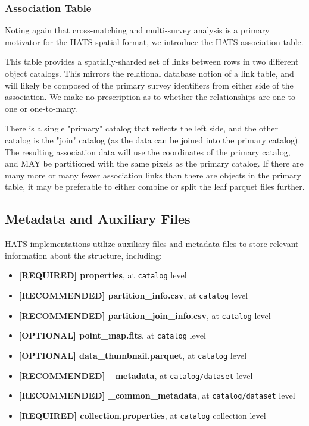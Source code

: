 \documentclass[11pt,a4paper]{ivoa}
\begin{document}
\subsubsection{Association Table} \label{sec:association}

Noting again that cross-matching and multi-survey analysis is a primary motivator for the HATS spatial format, we introduce the HATS association table. 

This table provides a spatially-sharded set of links between rows in two different object catalogs. 
This mirrors the relational database notion of a link table, and will likely be composed of the primary survey identifiers from either side of the association.
We make no prescription as to whether the relationships are one-to-one or one-to-many. \par

There is a single "primary" catalog that reflects the left side, and the other catalog is the "join" catalog (as the data can be joined into the primary catalog).
The resulting association data will use the coordinates of the primary catalog, and MAY be partitioned with the same pixels as the primary catalog.
If there are many more or many fewer association links than there are objects in the primary table, it may be preferable to either combine or split the leaf parquet files further.


\subsection{Metadata and Auxiliary Files} \label{sec:meta}
HATS implementations utilize auxiliary files and metadata files to store relevant information about the  structure, including:
\begin{itemize}
    \item \textbf{[REQUIRED] properties}, at  \texttt{catalog} level    
    \item \textbf{[RECOMMENDED] partition\_info.csv}, at  \texttt{catalog} level
    \item \textbf{[RECOMMENDED] partition\_join\_info.csv}, at  \texttt{catalog} level
    \item \textbf{[OPTIONAL] point\_map.fits}, at  \texttt{catalog} level
    \item \textbf{[OPTIONAL] data\_thumbnail.parquet}, at  \texttt{catalog} level
    \item \textbf{[RECOMMENDED] \_metadata}, at  \texttt{catalog/dataset} level
    \item \textbf{[RECOMMENDED] \_common\_metadata}, at  \texttt{catalog/dataset} level
    \item \textbf{[REQUIRED] collection.properties}, at  \texttt{catalog} collection level
\end{itemize}
    
\end{document}
